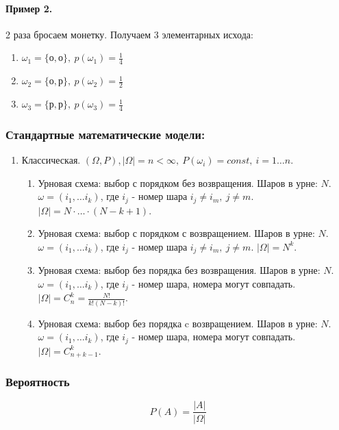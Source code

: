 \documentclass{article}
\begin{document}
  \paragraph*{Пример 2.} 2 раза бросаем монетку. Получаем 3 элементарных исхода: 
  \begin{enumerate}
  \item $ \omega_1 = \{\text{о}, \text{о}\},~ p(\omega_1) = \frac{1}{4} $
  \item $ \omega_2 = \{\text{о}, \text{р}\},~ p(\omega_2) = \frac{1}{2} $
  \item $ \omega_3 = \{\text{р}, \text{р}\},~ p(\omega_3) = \frac{1}{4} $
  \end{enumerate}

  \subsubsection*{Стандартные математические модели:}
  \begin{enumerate}
  \item Классическая.  $(\Omega, P), |\Omega| = n < \infty,~ P(\omega_i) = const,~ i = 1 \ldots n $.
  	\begin{enumerate}[label*=\arabic*.]
  	\item Урновая схема: выбор с порядком без возвращения. Шаров в урне: $N$. $\omega = (i_1, \ldots i_k)$, где $i_j$ - номер шара $ i_j \neq i_m,~ j \neq m $. $ | \Omega |  = N \cdot \ldots \cdot (N - k + 1) $.
  	\item Урновая схема: выбор с порядком с возвращением. Шаров в урне: $N$. $\omega = (i_1, \ldots i_k)$, где $i_j$ - номер шара $ i_j \neq i_m,~ j \neq m $. $ | \Omega |  = N^k $.
  	\item Урновая схема: выбор без порядка без возвращения. Шаров в урне: $N$. $\omega = (i_1, \ldots i_k)$, где $i_j$ - номер шара, номера могут совпадать. $ | \Omega |  = C_n^k = \frac{N!}{k!(N - k)!} $.
  	\item Урновая схема: выбор без порядка c возвращением. Шаров в урне: $N$. $\omega = (i_1, \ldots i_k)$, где $i_j$ - номер шара, номера могут совпадать. $ | \Omega |  = C_{n + k - 1}^k $.
  	\end{enumerate}
  \end{enumerate}
  
  \subsubsection*{Вероятность}
  $$ P(A) = \frac{|A|}{|\Omega|} $$
  
\end{document}
